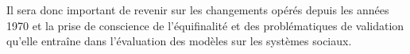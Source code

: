 Il sera donc important de revenir sur les changements opérés depuis les années 1970 et la prise de conscience de l'équifinalité et des problématiques de validation qu'elle entraîne dans l'évaluation des modèles sur les systèmes sociaux.









